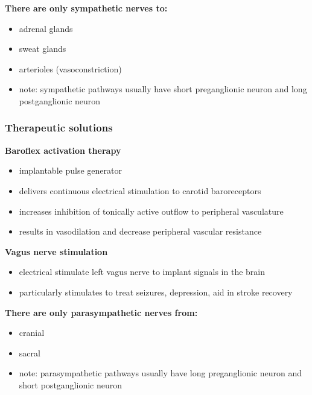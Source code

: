 \documentclass[11pt,fleqn]{book} %
\begin{document}
\textbf{There are only sympathetic nerves to:}
\begin{itemize}
    \item adrenal glands
    \item sweat glands
    \item arterioles (vasoconstriction)
    \item note: sympathetic pathways usually have short preganglionic neuron and long postganglionic neuron
\end{itemize}

\subsubsection{Therapeutic solutions}
\textbf{Baroflex activation therapy}
\begin{itemize}
    \item implantable pulse generator
    \item delivers continuous electrical stimulation to carotid baroreceptors
    \item increases inhibition of tonically active outflow to peripheral vasculature
    \item results in vasodilation and decrease peripheral vascular resistance
\end{itemize}

\textbf{Vagus nerve stimulation}
\begin{itemize}
    \item electrical stimulate left vagus nerve to implant signals in the brain
    \item particularly stimulates to treat seizures, depression, aid in stroke recovery
\end{itemize}

\textbf{There are only parasympathetic nerves from:}
\begin{itemize}
    \item cranial
    \item sacral
    \item note: parasympathetic pathways usually have long preganglionic neuron and short postganglionic neuron
\end{itemize}
\end{document}
